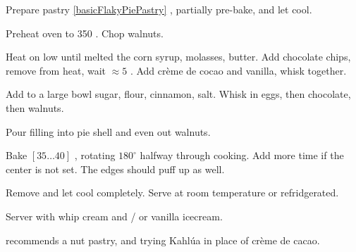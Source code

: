 \begin{preparation}
\item Prepare pastry \ref{basicFlakyPiePastry} , partially pre-bake, and let cool.

\item Preheat oven to 350 \Fahrenheit.
	Chop walnuts.

\item Heat on low until melted the corn syrup, molasses, butter.
	Add chocolate chips, remove from heat, wait $\approx 5$ \minute.
	Add cr\`{e}me de cocao and vanilla, whisk together.

\item Add to a large bowl sugar, flour, cinnamon, salt.
	Whisk in eggs, then chocolate, then walnuts.

\item Pour filling into pie shell and even out walnuts.

\item Bake $[35 \dots 40]$ \minute, rotating $180^\circ$ halfway through cooking.
	Add more time if the center is not set.
	The edges should puff up as well.

\item Remove and let cool completely.
	Serve at room temperature or refridgerated.
\end{preparation}


\begin{variation}
\item Server with whip cream and / or vanilla icecream.

\item \citeauthor{pie2004} \cite{pie2004} recommends a nut pastry, and trying Kahl\'{u}a in place of cr\`{e}me de cacao.
\end{variation}


\recipeend
